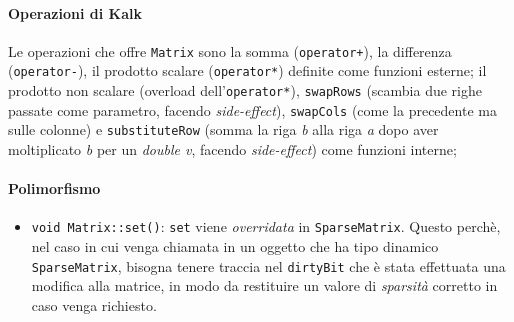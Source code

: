 \paragraph{Operazioni di Kalk} Le operazioni che offre \texttt{Matrix} sono
la somma (\texttt{operator+}), la differenza (\texttt{operator-}), il prodotto scalare (\texttt{operator*})
definite come funzioni esterne; il prodotto non scalare (overload dell'\texttt{operator*}), \texttt{swapRows} 
(scambia due righe passate come parametro, facendo \emph{side-effect}), \texttt{swapCols} (come la precedente 
ma sulle colonne) e \texttt{substituteRow} (somma la riga \emph{b} alla riga \emph{a} dopo aver moltiplicato 
\emph{b} per un \emph{double v}, facendo \emph{side-effect}) come funzioni interne;

\paragraph*{Polimorfismo} 
\begin{itemize}
    \item \texttt{void Matrix::set()}: \texttt{set} viene 
    \emph{overridata} in \texttt{SparseMatrix}. Questo perchè, nel caso in cui 
    venga chiamata in un oggetto che ha tipo dinamico \texttt{SparseMatrix},
    bisogna tenere traccia nel \texttt{dirtyBit} che è stata effettuata una modifica alla matrice, in modo
    da restituire un valore di \emph{sparsità} corretto in caso venga richiesto.
\end{itemize}